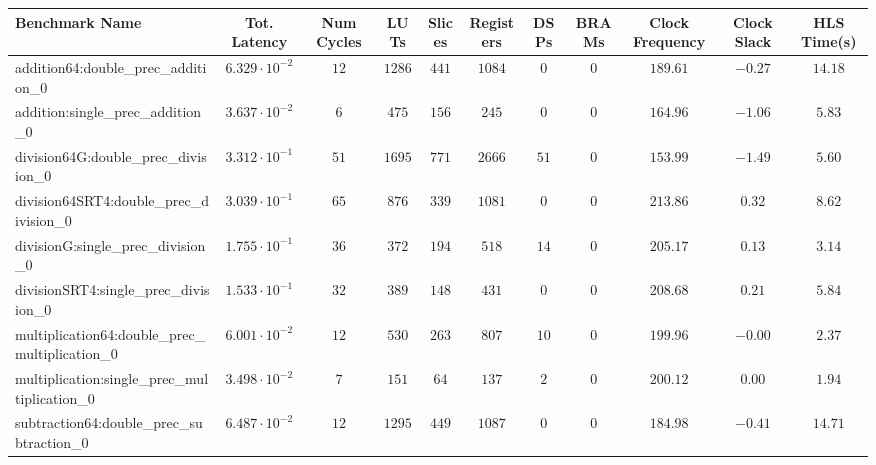 \begin{tabular}{|l|c|c|c|c|c|c|c|c|c|c|}
\hline
Benchmark Name                                   & Tot. Latency            & Num Cycles & LUTs     & Slices   & Registers & DSPs   & BRAMs & Clock Frequency & Clock Slack & HLS Time(s) \\
\hline
addition64:double\_prec\_addition\_0             & $ 6.329 \cdot 10^{-2} $ & $ 12     $ & $ 1286 $ & $ 441  $ & $ 1084  $ & $ 0  $ & $ 0 $ & $ 189.61      $ & $ -0.27   $ & $ 14.18   $ \\
addition:single\_prec\_addition\_0               & $ 3.637 \cdot 10^{-2} $ & $ 6      $ & $ 475  $ & $ 156  $ & $ 245   $ & $ 0  $ & $ 0 $ & $ 164.96      $ & $ -1.06   $ & $ 5.83    $ \\
division64G:double\_prec\_division\_0            & $ 3.312 \cdot 10^{-1} $ & $ 51     $ & $ 1695 $ & $ 771  $ & $ 2666  $ & $ 51 $ & $ 0 $ & $ 153.99      $ & $ -1.49   $ & $ 5.60    $ \\
division64SRT4:double\_prec\_division\_0         & $ 3.039 \cdot 10^{-1} $ & $ 65     $ & $ 876  $ & $ 339  $ & $ 1081  $ & $ 0  $ & $ 0 $ & $ 213.86      $ & $ 0.32    $ & $ 8.62    $ \\
divisionG:single\_prec\_division\_0              & $ 1.755 \cdot 10^{-1} $ & $ 36     $ & $ 372  $ & $ 194  $ & $ 518   $ & $ 14 $ & $ 0 $ & $ 205.17      $ & $ 0.13    $ & $ 3.14    $ \\
divisionSRT4:single\_prec\_division\_0           & $ 1.533 \cdot 10^{-1} $ & $ 32     $ & $ 389  $ & $ 148  $ & $ 431   $ & $ 0  $ & $ 0 $ & $ 208.68      $ & $ 0.21    $ & $ 5.84    $ \\
multiplication64:double\_prec\_multiplication\_0 & $ 6.001 \cdot 10^{-2} $ & $ 12     $ & $ 530  $ & $ 263  $ & $ 807   $ & $ 10 $ & $ 0 $ & $ 199.96      $ & $ -0.00   $ & $ 2.37    $ \\
multiplication:single\_prec\_multiplication\_0   & $ 3.498 \cdot 10^{-2} $ & $ 7      $ & $ 151  $ & $ 64   $ & $ 137   $ & $ 2  $ & $ 0 $ & $ 200.12      $ & $ 0.00    $ & $ 1.94    $ \\
subtraction64:double\_prec\_subtraction\_0       & $ 6.487 \cdot 10^{-2} $ & $ 12     $ & $ 1295 $ & $ 449  $ & $ 1087  $ & $ 0  $ & $ 0 $ & $ 184.98      $ & $ -0.41   $ & $ 14.71   $ \\

\end{tabular}
